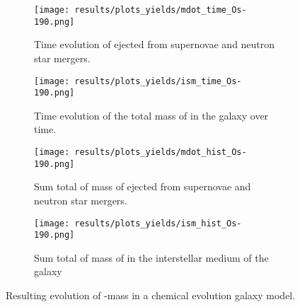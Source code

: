 \begin{figure}
  \begin{subfigure}{\subfigwidth}
    \centering
    \texttt{[image: results/plots\_yields/mdot\_time\_Os-190.png]}
    \caption{Time evolution of  ejected from supernovae and neutron star mergers.}
  \end{subfigure}
  \begin{subfigure}{\subfigwidth}
    \centering
    \texttt{[image: results/plots\_yields/ism\_time\_Os-190.png]}
    \caption{Time evolution of the total mass of  in the galaxy over time.}
  \end{subfigure}
  \begin{subfigure}{\subfigwidth}
    \centering
    \texttt{[image: results/plots\_yields/mdot\_hist\_Os-190.png]}
    \caption{Sum total of mass of  ejected from supernovae and neutron star mergers.}
  \end{subfigure}
  \begin{subfigure}{\subfigwidth}
    \centering
    \texttt{[image: results/plots\_yields/ism\_hist\_Os-190.png]}
    \caption{Sum total of mass of  in the interstellar medium of the galaxy}
  \end{subfigure}
  \caption{Resulting evolution of -mass in a chemical evolution galaxy model.}
\end{figure}
\begin{table}
  
\end{table}

